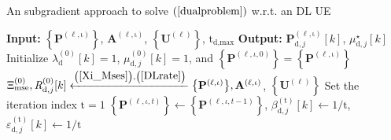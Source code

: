 \documentclass[9pt,journal]{IEEEtran}
\newcommand{\paren}[1]{\left({#1}\right)}
\newcommand{\bracket}[1]{{\left [{#1}\right ]}}
\newcommand{\braces}[1]{{\left\{ {#1}\right\}}}
\newcommand{\sfrac}[2]{#1/#2}
\begin{document}
	\begin{algorithm}[ht!]
		\caption{An subgradient approach to solve $\paren{\ref{dualproblem}}$ w.r.t. an DL UE}
		\label{DLalgorithm}
		\begin{algorithmic}[1]
			\Statex \textbf{Input: } $\braces{\mathbf{P}^{\paren{\mathrm{\ell,\iota}}}}$,  $\mathbf{A}^{\paren{\mathrm{\ell,\iota}}}$, $\braces{\mathbf{U}^{\paren{\mathrm{\ell}}}}$, $\mathrm{t}_{\textrm{d,max}}$
			\Statex \textbf{Output:} $\mathbf{P}^{\paren{\mathrm{\ell,\iota}}}_{\textrm{d},j}\bracket{k}$, $\mu^\star_{\textrm{d},j}\bracket{k}$
			\State Initialize $\lambda^{\paren{\mathrm{0}}}_{\textrm{d}}\bracket{k}=1$, $\mu^{\paren{\mathrm{0}}}_{\textrm{d},j}\bracket{k}=1$, and $\braces{\mathbf{P}^{\paren{\ell,\iota,0}}}=\braces{\mathbf{P}^{\paren{\mathrm{\ell,\iota}}}}$ 
			\State $\Xi^{\paren{\mathrm{0}}}_{\textrm{mse}},\mathit{R}^{\paren{\mathrm{0}}}_{\textrm{d},j}\bracket{k}\xleftarrow{\paren{\mathrm{\ref{Xi_Mses}}},\paren{\mathrm{\ref{DLrate}}}}\braces{\mathbf{P}^{\paren{\mathrm{\ell,\iota}}}},\mathbf{A}^{\paren{\mathrm{\ell,\iota}}}$, $\braces{\mathbf{U}^{\paren{\mathrm{\ell}}}}$
			\State Set the iteration index $\mathrm{t}=1$
			\Repeat
			\State $\braces{\mathbf{P}^{\paren{\ell,\iota,t}}}\leftarrow\braces{\mathbf{P}^{\paren{\ell,\iota,t-1}}}$, $\beta^{\paren{\mathrm{t}}}_{\textrm{d},j}\bracket{k}\leftarrow\sfrac{1}{\mathrm{t}}$, $\varepsilon^{\paren{\mathrm{t}}}_{\textrm{d},j}\bracket{k}\leftarrow\sfrac{1}{\mathrm{t}}$

\end{algorithmic}
\end{algorithm}
\end{document}
